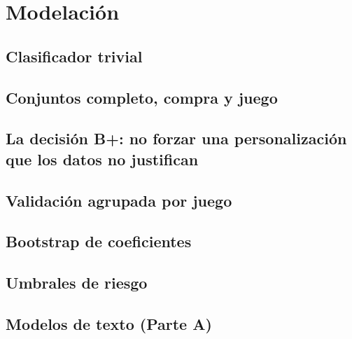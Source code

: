\section{Modelación}\label{sec:modelacion}

\subsection{Clasificador trivial}

\subsection{Conjuntos completo, compra y juego}

\subsection{La decisión B+: no forzar una personalización que los datos no justifican}\label{sec:modelacion-bmas}

\subsection{Validación agrupada por juego}\label{sec:modelacion-validacion}

\subsection{Bootstrap de coeficientes}\label{sec:modelacion-bootstrap}

\subsection{Umbrales de riesgo}

\subsection{Modelos de texto (Parte A)}
\pendienteEvidencia
